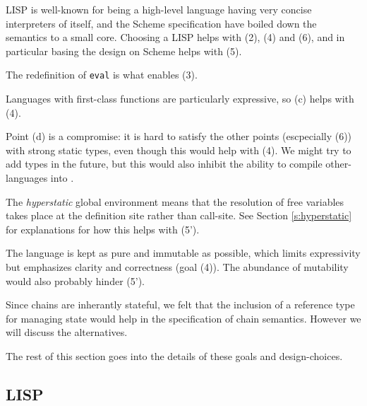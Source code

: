 LISP is well-known for being a high-level language having very concise
interpreters of itself, and the Scheme specification have boiled down the
semantics to a small core. Choosing a LISP helps with (2), (4) and (6), and in
particular basing the design on Scheme helps with (5).

The redefinition of \texttt{eval} is what enables (3).

Languages with first-class functions are particularly expressive, so (c) helps
with (4).

Point (d) is a compromise: it is hard to satisfy the other points (escpecially
(6)) with strong static types, even though this would help with (4). We might
try to add types in the future, but this would also inhibit the ability to
compile other-languages into \rad.

The \emph{hyperstatic} global environment means that the resolution of free
variables takes place at the definition site rather than call-site. See Section
\ref{s:hyperstatic} for explanations for how this helps with (5').

The language is kept as pure and immutable as possible, which limits
expressivity but emphasizes clarity and correctness (goal (4)). The abundance of
mutability would also probably hinder (5').

Since chains are inherantly stateful, we felt that the inclusion of a reference
type for managing state would help in the specification of chain semantics.
However we will discuss the alternatives.

The rest of this section goes into the details of these goals and
design-choices.



\subsection{LISP}

